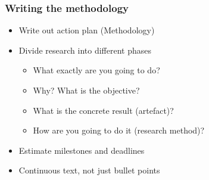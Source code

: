 \documentclass[aspectratio=169]{beamer}
\begin{document}
\begin{frame}
  \frametitle{Writing the methodology}

  \begin{itemize}
    \item Write out action plan (Methodology)
    \item Divide research into different phases
          \begin{itemize}
            \item What exactly are you going to do?
            \item Why? What is the objective?
            \item What is the concrete result (artefact)?
            \item How are you going to do it (research method)?
          \end{itemize}
    \item Estimate milestones and deadlines
    \item Continuous text, not just bullet points
  \end{itemize}

\end{frame}
\end{document}
